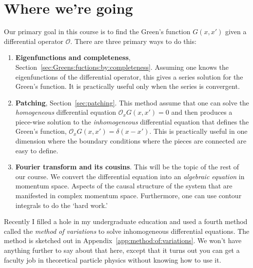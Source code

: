 \documentclass[
  11pt,
	colorful,
	raggedright,
]{tufte-style-thesis-flip}
\begin{document}
\section{Where we're going}
\label{sec:ways:to:solve:G}

Our primary goal in this course is to find the Green's function $G(x,x')$ given a differential operator $\mathcal O$. There are three primary ways to do this:
\begin{enumerate}
\item \textbf{Eigenfunctions and completeness}, Section~\ref{sec:Greens:fuctions:by:completeness}. Assuming one knows the eigenfunctions of the differential operator, this gives a series solution for the Green's function. It is practically useful only when the series is convergent.

\item \textbf{Patching}, Section~\ref{sec:patching}. This method assume that one can solve the \emph{homogeneous} differential equation $\mathcal O_x G(x,x')=0$ and then produces a piece-wise solution to the \emph{inhomogeneous} differential equation that defines the Green's function, $\mathcal O_x G(x,x')=\delta(x-x')$. This is practically useful in one dimension where the boundary conditions where the pieces are connected are easy to define.

\item \textbf{Fourier transform and its cousins}. This will be the topic of the rest of our course. We convert the differential equation into an \emph{algebraic equation} in momentum space. Aspects of the causal structure of the system that are manifested in complex momentum space. Furthermore, one can use contour integrals to do the `hard work.'
\end{enumerate}

Recently I filled a hole in my undergraduate education and used a fourth method called the \emph{method of variations} to solve inhomogeneous differential equations. The method is sketched out in Appendix~\ref{app:method:of:variations}. We won't have anything further to say about that here, except that it turns out you can get a faculty job in theoretical particle physics without knowing how to use it.
\end{document}
